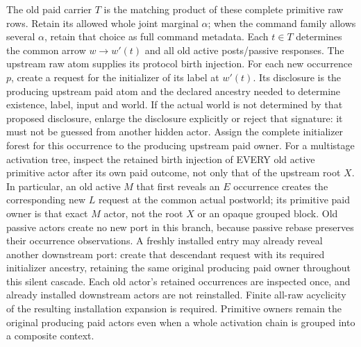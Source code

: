 \documentclass[11pt]{article}
\begin{document}
The old paid carrier $T$ is the matching product of these complete primitive raw rows. Retain its allowed whole joint marginal $\alpha$; when the command family allows several $\alpha$, retain that choice as full command metadata. Each $t\in T$ determines the common arrow $w\to w'(t)$ and all old active posts/passive responses. The upstream raw atom supplies its protocol birth injection. For each new occurrence $p$, create a request for the initializer of its label at $w'(t)$. Its disclosure is the producing upstream paid atom and the declared ancestry needed to determine existence, label, input and world. If the actual world is not determined by that proposed disclosure, enlarge the disclosure explicitly or reject that signature: it must not be guessed from another hidden actor. Assign the complete initializer forest for this occurrence to the producing upstream paid owner. For a multistage activation tree, inspect the retained birth injection of EVERY old active primitive actor after its own paid outcome, not only that of the upstream root $X$. In particular, an old active $M$ that first reveals an $E$ occurrence creates the corresponding new $L$ request at the common actual postworld; its primitive paid owner is that exact $M$ actor, not the root $X$ or an opaque grouped block. Old passive actors create no new port in this branch, because passive rebase preserves their occurrence observations. A freshly installed entry may already reveal another downstream port: create that descendant request with its required initializer ancestry, retaining the same original producing paid owner throughout this silent cascade. Each old actor's retained occurrences are inspected once, and already installed downstream actors are not reinstalled. Finite all-raw acyclicity of the resulting installation expansion is required. Primitive owners remain the original producing paid actors even when a whole activation chain is grouped into a composite context.
\end{document}
